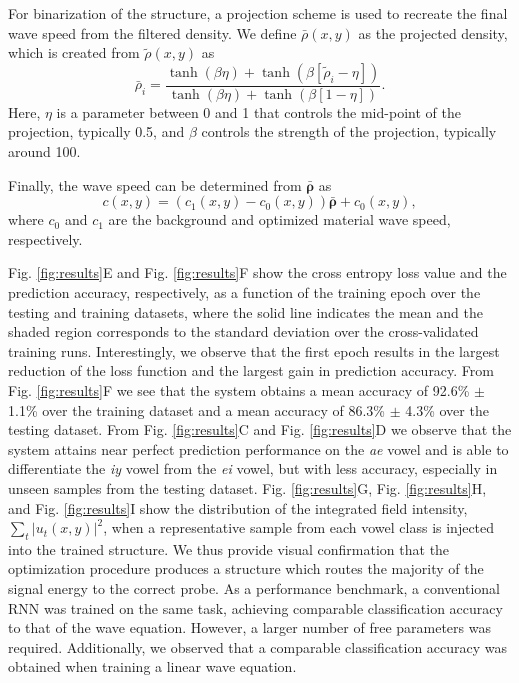 For binarization of the structure, a projection scheme is used to recreate the final wave speed from the filtered density.  We define $\bar{\rho}(x,y)$ as the projected density, which is created from $\tilde{\rho}(x,y)$ as
\begin{equation}
\bar{\rho}_i = \frac{\tanh{\left( \beta \eta \right)} + \tanh{\left( \beta \left[ \tilde{\rho}_i - \eta \right] \right)}}{\tanh{\left( \beta \eta  \right)} + \tanh{\left( \beta \left[ 1 - \eta \right] \right)}}.
\end{equation}
Here, $\eta$ is a parameter between 0 and 1 that controls the mid-point of the projection, typically 0.5, and $\beta$ controls the strength of the projection, typically around 100.

Finally, the wave speed can be determined from $\bm{\bar{\rho}}$ as
\begin{equation}
c(x,y) = (c_1(x,y) - c_0(x,y))\bm{\bar{\rho}} + c_0(x,y),
\end{equation}
where $c_0$ and $c_1$ are the background and optimized material wave speed, respectively.



Fig. \ref{fig:results}E and Fig. \ref{fig:results}F show the cross entropy loss value and the prediction accuracy, respectively, as a function of the training epoch over the testing and training datasets, where the solid line indicates the mean and the shaded region corresponds to the standard deviation over the cross-validated training runs.
Interestingly, we observe that the first epoch results in the largest reduction of the loss function and the largest gain in prediction accuracy.
From Fig. \ref{fig:results}F we see that the system obtains a mean accuracy of 92.6\% $\pm$ 1.1\% over the training dataset and a mean accuracy of 86.3\% $\pm$ 4.3\% over the testing dataset.
From Fig. \ref{fig:results}C and Fig. \ref{fig:results}D we observe that the system attains near perfect prediction performance on the \textit{ae} vowel and is able to differentiate the \textit{iy} vowel from the \textit{ei} vowel, but with less accuracy, especially in unseen samples from the testing dataset. 
Fig. \ref{fig:results}G, Fig. \ref{fig:results}H, and Fig. \ref{fig:results}I show the distribution of the integrated field intensity, $\sum_t{\left\vert u_t{\left(x,y\right)} \right\vert^2}$, when a representative sample from each vowel class is injected into the trained structure. 
We thus provide visual confirmation that the optimization procedure produces a structure which routes the majority of the signal energy to the correct probe. 
As a performance benchmark, a conventional RNN was trained on the same task, achieving comparable classification accuracy to that of the wave equation. However, a larger number of free parameters was required.
Additionally, we observed that a comparable classification accuracy was obtained when training a linear wave equation.


